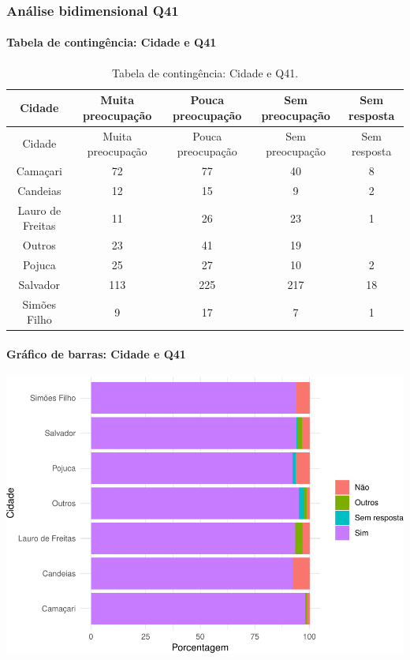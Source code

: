 \documentclass[]{article}
\let\oldparagraph\paragraph
\renewcommand{\paragraph}[1]{\oldparagraph{#1}\mbox{}}
\begin{document}
\cleardoublepage

\hypertarget{anuxe1lise-bidimensional-q41}{%
\subsubsection{Análise bidimensional Q41}\label{anuxe1lise-bidimensional-q41}}

\hypertarget{tabela-de-continguxeancia-cidade-e-q41}{%
\paragraph{Tabela de contingência: Cidade e Q41}\label{tabela-de-continguxeancia-cidade-e-q41}}

\begin{longtable}[]{@{}ccccc@{}}
\caption{\label{tab:unnamed-chunk-1606}Tabela de contingência: Cidade e Q41.}\tabularnewline
\toprule
Cidade & Muita preocupação & Pouca preocupação & Sem preocupação & Sem resposta\tabularnewline
\midrule
\endfirsthead
\toprule
Cidade & Muita preocupação & Pouca preocupação & Sem preocupação & Sem resposta\tabularnewline
\midrule
\endhead
Camaçari & 72 & 77 & 40 & 8\tabularnewline
Candeias & 12 & 15 & 9 & 2\tabularnewline
Lauro de Freitas & 11 & 26 & 23 & 1\tabularnewline
Outros & 23 & 41 & 19 &\tabularnewline
Pojuca & 25 & 27 & 10 & 2\tabularnewline
Salvador & 113 & 225 & 217 & 18\tabularnewline
Simões Filho & 9 & 17 & 7 & 1\tabularnewline
\bottomrule
\end{longtable}

\hypertarget{gruxe1fico-de-barras-cidade-e-q41}{%
\paragraph{Gráfico de barras: Cidade e Q41}\label{gruxe1fico-de-barras-cidade-e-q41}}

\begin{center}\includegraphics[width=0.75\linewidth]{relatorio_covid19_files/figure-latex/unnamed-chunk-1607-1} \end{center}
\end{document}
